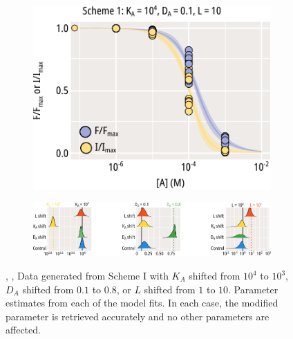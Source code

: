 \begin{figure}[h]
\begin{subfigure}[t]{0.3\textwidth}
		\centering
		\includegraphics[width=\textwidth]{mwc_scheme_1_l_shift.pdf}
	\end{subfigure}
	\vfill
	\begin{subfigure}[t]{0.9\textwidth}
		\caption{}\label{ch4fig:mwc_params_2}
		\centering
		\includegraphics[width=\textwidth]{mwc_scheme_param_fits_2.pdf}
	\end{subfigure}
	\caption[Parameter retrieval from MWC models]{
	, ,  Data generated from Scheme I with  $K_A$ shifted from $10^4$ to $10^3$,  $D_A$ shifted from $0.1$ to $0.8$, or  $L$ shifted from $1$ to $10$.
	 Parameter estimates from each of the model fits.
	In each case, the modified parameter is retrieved accurately and no other parameters are affected.
	}\label{ch4fig:scheme_1_shifts}
\end{figure}

